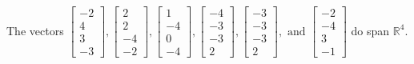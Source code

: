 \begin{exercise}
\begin{exerciseStatement}
  \end{exerciseStatement}
  \begin{exerciseAnswer}
   The vectors \(\left[\begin{array}{r}
-2 \\
4 \\
3 \\
-3
\end{array}\right] , \left[\begin{array}{r}
2 \\
2 \\
-4 \\
-2
\end{array}\right] , \left[\begin{array}{r}
1 \\
-4 \\
0 \\
-4
\end{array}\right] , \left[\begin{array}{r}
-4 \\
-3 \\
-3 \\
2
\end{array}\right] , \left[\begin{array}{r}
-3 \\
-3 \\
-3 \\
2
\end{array}\right] , \text{ and } \left[\begin{array}{r}
-2 \\
-4 \\
3 \\
-1
\end{array}\right]\) 
  	 do  
	span \(\mathbb{R}^4\).
  


  \end{exerciseAnswer}
\end{exercise}